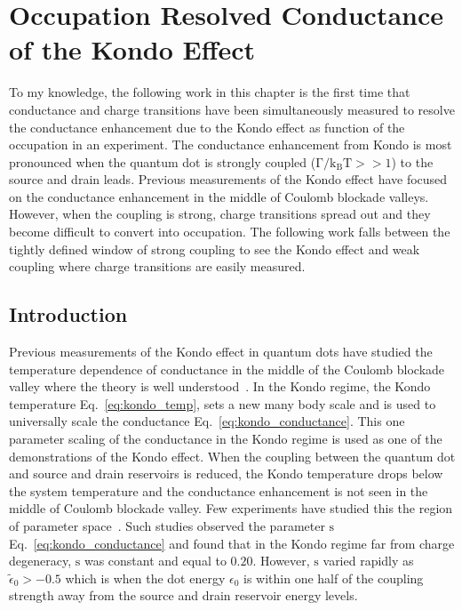 \chapter[Occupation Resolved Conductance of the Kondo Effect]{Occupation Resolved Conductance of the Kondo Effect}\label{cha:mixed_valence_conductance}


To my knowledge, the following work in this chapter is the first time that conductance and charge transitions have been simultaneously measured to resolve the conductance enhancement due to the Kondo effect as function of the occupation in an experiment. The conductance enhancement from Kondo is most pronounced when the quantum dot is strongly coupled ($\mathrm{\Gamma/k_BT}>>1$) to the source and drain leads. Previous measurements of the Kondo effect have focused on the conductance enhancement in the middle of Coulomb blockade valleys. However, when the coupling is strong, charge transitions spread out and they become difficult to convert into occupation. The following work falls between the tightly defined window of strong coupling to see the Kondo effect and weak coupling where charge transitions are easily measured. 

\section{Introduction}
Previous measurements of the Kondo effect in quantum dots have studied the temperature dependence of conductance in the middle of the Coulomb blockade valley where the theory is well understood~\cite{kondo_unitary, costi_kondo_mv_eo_regime}. In the Kondo regime, the Kondo temperature Eq.~\ref{eq:kondo_temp}, sets a new many body scale and is used to universally scale the conductance Eq.~\ref{eq:kondo_conductance}. This one parameter scaling of the conductance in the Kondo regime is used as one of the demonstrations of the Kondo effect. When the coupling between the quantum dot and source and drain reservoirs is reduced, the Kondo temperature drops below the system temperature and the conductance enhancement is not seen in the middle of Coulomb blockade valley. Few experiments have studied this the region of parameter space~\cite{goldhaber_mv}. Such studies observed the parameter $\mathrm{s}$ Eq.~\ref{eq:kondo_conductance} and found that in the Kondo regime far from charge degeneracy, $\mathrm{s}$ was constant and equal to $0.20$. However, $\mathrm{s}$ varied rapidly as $\tilde{\epsilon}_0>-0.5$ which is when the dot energy $\epsilon_0$ is within one half of the coupling strength away from the source and drain reservoir energy levels.  

